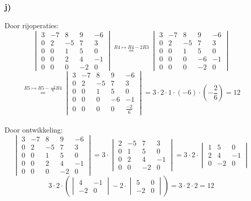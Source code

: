 \documentclass[lineaire_algebra_oplossingen.tex]{subfiles}
\begin{document}
\subsubsection*{j)}
Door rijoperaties:\\
\[
\begin{vmatrix}
3 & -7 & 8 & 9 & -6\\
0 & 2 & -5 & 7 & 3\\
0 & 0 & 1 & 5 & 0\\
0 & 0 & 2 & 4 & -1\\
0 & 0 & 0 & -2 & 0
\end{vmatrix}
\overset{R4 \longmapsto R4-2R3}{=}
\begin{vmatrix}
3 & -7 & 8 & 9 & -6\\
0 & 2 & -5 & 7 & 3\\
0 & 0 & 1 & 5 & 0\\
0 & 0 & 0 & -6 & -1\\
0 & 0 & 0 & -2 & 0
\end{vmatrix}
\]
\[
\overset{R5 \longmapsto R5-\frac{-2}{6}R4}{=}
\begin{vmatrix}
3 & -7 & 8 & 9 & -6\\
0 & 2 & -5 & 7 & 3\\
0 & 0 & 1 & 5 & 0\\
0 & 0 & 0 & -6 & -1\\
0 & 0 & 0 & 0 & \frac{-2}{6}
\end{vmatrix}
=
3\cdot 2 \cdot 1 \cdot (-6) \cdot (-\frac{2}{6}) = 12
\]\\
Door ontwikkeling:
\[
\begin{vmatrix}
3 & -7 & 8 & 9 & -6\\
0 & 2 & -5 & 7 & 3\\
0 & 0 & 1 & 5 & 0\\
0 & 0 & 2 & 4 & -1\\
0 & 0 & 0 & -2 & 0
\end{vmatrix}
=
3 \cdot
\begin{vmatrix}
2 & -5 & 7 & 3\\
0 & 1 & 5 & 0\\
0 & 2 & 4 & -1\\
0 & 0 & -2 & 0
\end{vmatrix}
=
3 \cdot 2 \cdot
\begin{vmatrix}
1 & 5 & 0\\
2 & 4 & -1\\
0 & -2 & 0
\end{vmatrix}
\]
\[
3\cdot 2\cdot \left( 
\begin{vmatrix}
4 & -1\\
-2 & 0
\end{vmatrix}
-2\cdot
\begin{vmatrix}
5 & 0\\
-2 & 0
\end{vmatrix}
\right)
=
3\cdot 2 \cdot 2 = 12
\]
\end{document}
